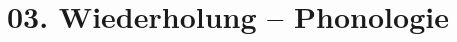 \documentclass[handout,aspectratio=1610,dvipsnames]{beamer}
\begin{document}
  \section[Phonologie]{03. Wiederholung -- Phonologie}
  \let\woopsi\section\let\section\subsection\let\subsection\subsubsection
  
  \let\subsection\section\let\section\woopsi
  
\end{document}
